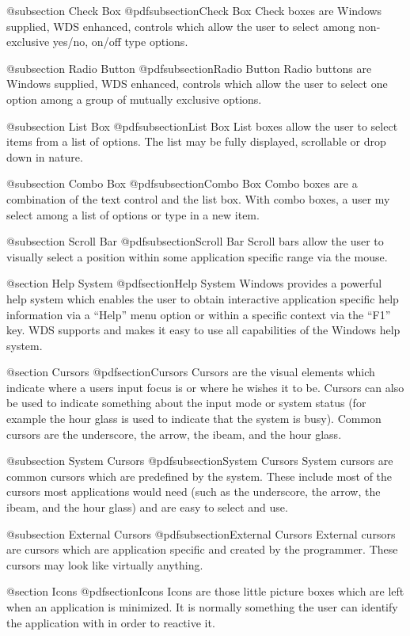 @subsection Check Box
@pdfsubsection{Check Box}
Check boxes are Windows supplied, WDS enhanced, controls which allow
the user to select among non-exclusive yes/no, on/off type options.

@subsection Radio Button
@pdfsubsection{Radio Button}
Radio buttons are Windows supplied, WDS enhanced, controls which allow
the user to select one option among a group of mutually exclusive options.

@subsection List Box
@pdfsubsection{List Box}
List boxes allow the user to select items from a list of options.  The
list may be fully displayed, scrollable or drop down in nature.

@subsection Combo Box
@pdfsubsection{Combo Box}
Combo boxes are a combination of the text control and the list box.
With combo boxes, a user my select among a list of options or type
in a new item.

@subsection Scroll Bar
@pdfsubsection{Scroll Bar}
Scroll bars allow the user to visually select a position within some
application specific range via the mouse.

@section Help System
@pdfsection{Help System}
Windows provides a powerful help system which enables the user to obtain
interactive application specific help information via a ``Help'' menu
option or within a specific context via the ``F1'' key.  WDS supports
and makes it easy to use all capabilities of the Windows help system.

@section Cursors
@pdfsection{Cursors}
Cursors are the visual elements which indicate where a users input focus
is or where he wishes it to be.  Cursors can also be used to indicate
something about the input mode or system status (for example the hour
glass is used to indicate that the system is busy).  Common cursors are
the underscore, the arrow, the ibeam, and the hour glass.

@subsection System Cursors
@pdfsubsection{System Cursors}
System cursors are common cursors which are predefined by the system.
These include most of the cursors most applications would need (such as
the underscore, the arrow, the ibeam, and the hour glass) and are easy to
select and use.

@subsection External Cursors
@pdfsubsection{External Cursors}
External cursors are cursors which are application specific and
created by the programmer.  These cursors may look like virtually
anything.

@section Icons
@pdfsection{Icons}
Icons are those little picture boxes which are left when an application
is minimized.  It is normally something the user can identify the
application with in order to reactive it.

